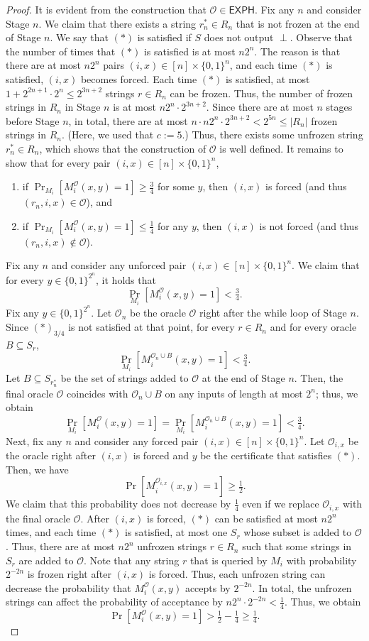 \begin{proof}
It is evident from the construction that $\mathcal O\in\mathsf{EXPH}$.
Fix any $n$ and consider Stage $n$. We claim that there exists a string $r_n^*\in R_n$ that is not frozen at the end of Stage $n$. We say that $(*)$ is satisfied if $S$ does not output $\perp$. Observe that the number of times that $(*)$ is satisfied is at most $n2^n$. The reason is that there are at most $n2^n$ pairs $(i,x)\in[n]\times\{0,1\}^n$, and each time $(*)$ is satisfied, $(i,x)$ becomes forced. Each time $(*)$ is satisfied, at most $1+2^{2n+1}\cdot2^n\leq2^{3n+2}$ strings $r\in R_n$ can be frozen. Thus, the number of frozen strings in $R_n$ in Stage $n$ is at most $n2^n\cdot2^{3n+2}$. Since there are at most $n$ stages before Stage $n$, in total, there are at most $n\cdot n2^n\cdot2^{3n+2}<2^{5n}\leq|R_n|$ frozen strings in $R_n$. (Here, we used that $c:=5$.) Thus, there exists some unfrozen string $r_n^*\in R_n$, which shows that the construction of $\mathcal O$ is well defined.
It remains to show that for every pair $(i,x)\in[n]\times\{0,1\}^n$,
\begin{enumerate}
\item if $\Pr_{M_i}[M_i^{\mathcal O}(x,y)=1]\geq\frac34$ for some $y$, then $(i,x)$ is forced (and thus $(r_n,i,x)\in\mathcal O$), and
\item if $\Pr_{M_i}[M_i^{\mathcal O}(x,y)=1]\leq\frac14$ for any $y$, then $(i,x)$ is not forced (and thus $(r_n,i,x)\notin\mathcal O$).
\end{enumerate}
Fix any $n$ and consider any unforced pair $(i,x)\in[n]\times\{0,1\}^n$. We claim that for every $y\in\{0,1\}^{2^n}$, it holds that
\[\Pr_{M_i}[M_i^{\mathcal O}(x,y)=1]<\tfrac34.\]
Fix any $y\in\{0,1\}^{2^n}$. Let $\mathcal O_n$ be the oracle $\mathcal O$ right after the while loop of Stage $n$. Since $(*)_{3/4}$ is not satisfied at that point, for every $r\in R_n$ and for every oracle $B\subseteq S_r$,
\[\Pr_{M_i}[M_i^{\mathcal O_n\cup B}(x,y)=1]<\tfrac34.\]
Let $B\subseteq S_{r_n^*}$ be the set of strings added to $\mathcal O$ at the end of Stage $n$. Then, the final oracle $\mathcal O$ coincides with $\mathcal O_n\cup B$ on any inputs of length at most $2^n$; thus, we obtain
\[\Pr_{M_i}[M_i^{\mathcal O}(x,y)=1]=\Pr_{M_i}[M_i^{\mathcal O_n\cup B}(x,y)=1]<\tfrac34.\]
Next, fix any $n$ and consider any forced pair $(i,x)\in[n]\times\{0,1\}^n$. Let $\mathcal O_{i,x}$ be the oracle right after $(i,x)$ is forced and $y$ be the certificate that satisfies $(*)$. Then, we have
\[\Pr[M_i^{\mathcal O_{i,x}}(x,y)=1]\geq\tfrac12.\]
We claim that this probability does not decrease by $\frac14$ even if we replace $\mathcal O_{i,x}$ with the final oracle $\mathcal O$. After $(i,x)$ is forced, $(*)$ can be satisfied at most $n2^n$ times, and each time $(*)$ is satisfied, at most one $S_r$ whose subset is added to $\mathcal O$. Thus, there are at most $n2^n$ unfrozen strings $r\in R_n$ such that some strings in $S_r$ are added to $\mathcal O$. Note that any string $r$ that is queried by $M_i$ with probability $2^{-2n}$ is frozen right after $(i,x)$ is forced. Thus, each unfrozen string can decrease the probability that $M_i^{\mathcal O}(x,y)$ accepts by $2^{-2n}$. In total, the unfrozen strings can affect the probability of acceptance by $n2^n\cdot2^{-2n}<\frac14$. Thus, we obtain
\[\Pr[M_i^{\mathcal O}(x,y)=1]>\tfrac12-\tfrac14\geq\tfrac14.\]
\end{proof}

